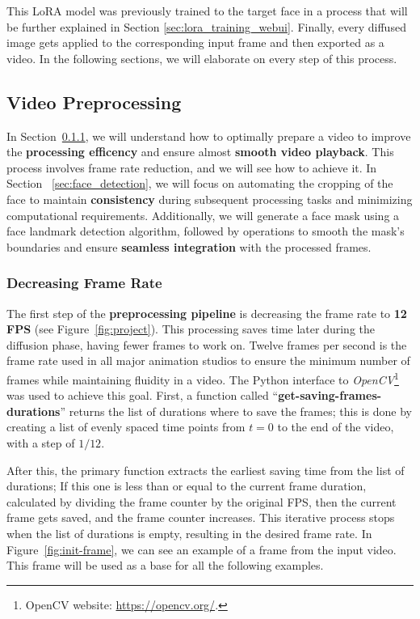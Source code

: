 \documentclass[sn-mathphys,Numbered]{sn-jnl}
\theoremstyle{thmstyleone}%
\theoremstyle{thmstyletwo}%
\theoremstyle{thmstylethree}%
\begin{document}
This LoRA model was previously trained to the target face in a process that will be further explained in Section \ref{sec:lora_training_webui}.  Finally, every diffused image gets applied to the corresponding input frame and then exported as a video. In the following sections, we will elaborate on every step of this process. 



\subsection{Video Preprocessing} \label{sec:video_preprocessing}

In Section~\ref{sec:decreasing_frame_rate}, we will understand how to optimally prepare a video to improve the \textbf{processing efficency} and ensure almost \textbf{smooth video playback}. This process involves frame rate reduction, and we will see how to achieve it.
In Section ~\ref{sec:face_detection}, we will focus on automating the cropping of the face to maintain \textbf{consistency} during subsequent processing tasks and minimizing computational requirements. Additionally, we will generate a face mask using a face landmark detection algorithm, followed by operations to smooth the mask's boundaries and ensure \textbf{seamless integration} with the processed frames.



\subsubsection{Decreasing Frame Rate}\label{sec:decreasing_frame_rate}

The first step of the \textbf{preprocessing pipeline} is decreasing the frame rate to \textbf{12 FPS} (see Figure~\ref{fig:project}). 
This processing saves time later during the diffusion phase, having fewer frames to work on. 
Twelve frames per second is the frame rate used in all major animation studios to ensure the minimum number of  frames while maintaining fluidity in a video. The Python interface to \emph{OpenCV}\footnote{OpenCV website: \url{https://opencv.org/}.} 
was used to achieve this goal.  First, a function called ``\textbf{get-saving-frames-durations}'' returns the list of durations where to save the frames; this is done by creating a list of evenly spaced time points from $t=0$ to the end of the video, with a step of $1/12$. 

After this, the primary function extracts the earliest saving time from the list of durations; 
If this one is less than or equal to the current frame duration, calculated by dividing the frame counter by the original FPS,  then the current frame gets saved, and the frame counter increases. This iterative process stops when the list of durations is empty, resulting in the desired frame rate. In Figure~\ref{fig:init-frame}, we can see an example of a frame from the input video. This frame will be used as a base for all the following examples.
\end{document}
